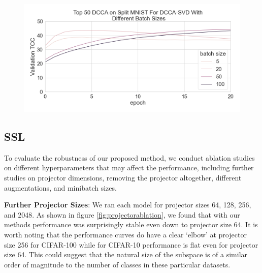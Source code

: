 \begin{figure}[h]
\centering
\includegraphics[width=\textwidth]{figures/deep_learning/DCCA/deep_SplitMNIST_minibatch_size_ablation.png}
\caption{}
\label{fig:deep minibatch size ablation}
\end{figure}


\subsection{SSL}
To evaluate the robustness of our proposed method, we conduct ablation studies on different hyperparameters that may affect the performance, including further studies on projector dimensions, removing the projector altogether, different augmentations, and minibatch sizes.

\textbf{Further Projector Sizes}: We ran each model for projector sizes 64, 128, 256, and 2048. As shown in figure \ref{fig:projectorablation}, we found that with our methods performance was surprisingly stable even down to projector size 64. It is worth noting that the performance curves do have a clear `elbow' at projector size 256 for CIFAR-100 while for CIFAR-10 performance is flat even for projector size 64. This could suggest that the natural size of the subspace is of a similar order of magnitude to the number of classes in these particular datasets. 

